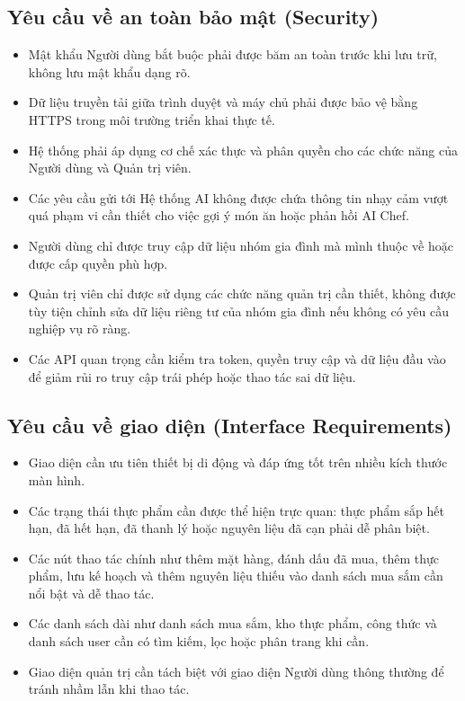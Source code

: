 \subsection{Yêu cầu về an toàn bảo mật (Security)}
\begin{itemize}
    \item Mật khẩu Người dùng bắt buộc phải được băm an toàn trước khi lưu trữ, không lưu mật khẩu dạng rõ.
    \item Dữ liệu truyền tải giữa trình duyệt và máy chủ phải được bảo vệ bằng HTTPS trong môi trường triển khai thực tế.
    \item Hệ thống phải áp dụng cơ chế xác thực và phân quyền cho các chức năng của Người dùng và Quản trị viên.
    \item Các yêu cầu gửi tới Hệ thống AI không được chứa thông tin nhạy cảm vượt quá phạm vi cần thiết cho việc gợi ý món ăn hoặc phản hồi AI Chef.
    \item Người dùng chỉ được truy cập dữ liệu nhóm gia đình mà mình thuộc về hoặc được cấp quyền phù hợp.
    \item Quản trị viên chỉ được sử dụng các chức năng quản trị cần thiết, không được tùy tiện chỉnh sửa dữ liệu riêng tư của nhóm gia đình nếu không có yêu cầu nghiệp vụ rõ ràng.
    \item Các API quan trọng cần kiểm tra token, quyền truy cập và dữ liệu đầu vào để giảm rủi ro truy cập trái phép hoặc thao tác sai dữ liệu.
\end{itemize}

\subsection{Yêu cầu về giao diện (Interface Requirements)}
\begin{itemize}
    \item Giao diện cần ưu tiên thiết bị di động và đáp ứng tốt trên nhiều kích thước màn hình.
    \item Các trạng thái thực phẩm cần được thể hiện trực quan: thực phẩm sắp hết hạn, đã hết hạn, đã thanh lý hoặc nguyên liệu đã cạn phải dễ phân biệt.
    \item Các nút thao tác chính như thêm mặt hàng, đánh dấu đã mua, thêm thực phẩm, lưu kế hoạch và thêm nguyên liệu thiếu vào danh sách mua sắm cần nổi bật và dễ thao tác.
    \item Các danh sách dài như danh sách mua sắm, kho thực phẩm, công thức và danh sách user cần có tìm kiếm, lọc hoặc phân trang khi cần.
    \item Giao diện quản trị cần tách biệt với giao diện Người dùng thông thường để tránh nhầm lẫn khi thao tác.
\end{itemize}
